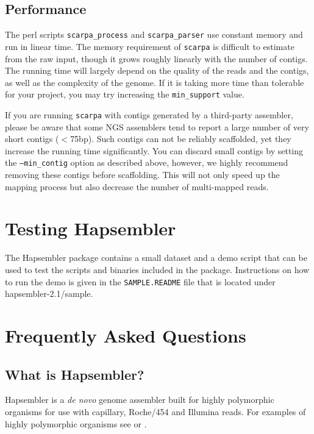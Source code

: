 \documentclass[12pt,a4paper]{report}
\newcommand{\hapversion}{2.1}
\begin{document}
\subsection{Performance}

The perl scripts \texttt{scarpa\_process} and \texttt{scarpa\_parser} use constant memory and run in linear time. The memory requirement of \texttt{scarpa} is difficult to estimate from the raw input, though it grows roughly linearly with the number of contigs. The running time will largely  depend on the quality of the reads and the contigs, as well as the complexity of the genome. If it is taking more time than tolerable for your project, you may try increasing the \texttt{min\_support} value.

If you are running \texttt{scarpa} with contigs generated by a third-party assembler, please be aware that some NGS assemblers tend to report a large number of very short contigs ($<$75bp). Such contigs can not be reliably scaffolded, yet they increase the running time significantly. You can discard small contigs by setting the \texttt{--min\_contig} option as described above, however, we highly recommend removing these contigs before scaffolding. This will not only speed up the mapping process but also decrease the number of multi-mapped reads. 

\section{Testing Hapsembler}

The Hapsembler package contains a small dataset and a demo script that can be used to test the scripts and binaries included in the package. Instructions on how to run the demo is given in the \texttt{SAMPLE.README} file that is located under hapsembler-\hapversion{}/sample.

\section{Frequently Asked Questions}
\label{faq}

\subsection{What is Hapsembler?}

Hapsembler\cite{donmez11} is a \emph{de novo} genome assembler built for highly polymorphic organisms for use with capillary, Roche/454 and Illumina reads. For examples of highly polymorphic organisms see \cite{small2} or \cite{sodergren}.
\end{document}
